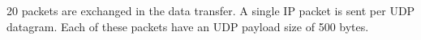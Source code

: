 20 packets are exchanged in the data transfer. A single IP packet is sent per UDP datagram. Each of these packets have an UDP payload size of 500 bytes.


